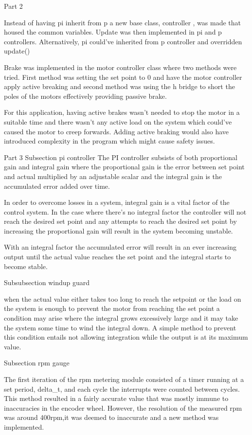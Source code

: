 Part 2

Instead of having pi inherit from p a new base class, controller , was made that housed the common variables. Update was then implemented in pi and p controllers. Alternatively, pi could've inherited from p controller and overridden update() 

Brake was implemented in the motor controller class where two methods were tried. First method was setting the set point to 0 and have the motor controller apply active breaking and second method was using the h bridge to short the poles of the motors effectively providing passive brake. 

For this application, having active brakes wasn't needed to stop the motor in a suitable time and there wasn't any active load on the system which could've caused the motor to creep forwards. Adding active braking would also have introduced complexity in the program which might cause safety issues. 



Part 3
Subsection pi controller
The PI controller subsists of both proportional gain and integral gain where the proportional gain is the error between set point and actual multiplied by an adjustable scalar and the integral gain is the accumulated error added over time.

In order to overcome losses in a system, integral gain is a vital factor of the control system. In the case where there's no integral factor the controller will not reach the desired set point and any attempts to reach the desired set point by increasing the proportional gain will result in the system becoming unstable.

With an integral factor the accumulated error will result in an ever increasing output until the actual value reaches the set point and the integral starts to become stable.

Subsubsection windup guard

when the actual value either takes too long to reach the setpoint or the load on the system is enough to prevent the motor from reaching the set point a condition may arise where the integral grows excessively large and it may take the system some time to wind the integral down. A simple method  to prevent this condition entails not allowing integration while the output is at its maximum value.

Subsection rpm gauge

The first iteration of the rpm metering module consisted of a timer running at a set period, delta\_t, and each cycle the interrupts were counted between cycles. This method resulted in a fairly accurate value that was mostly immune to inaccuracies in the encoder wheel. However, the resolution of the measured rpm was around 400rpm,it was deemed to inaccurate and a new method was implemented.

